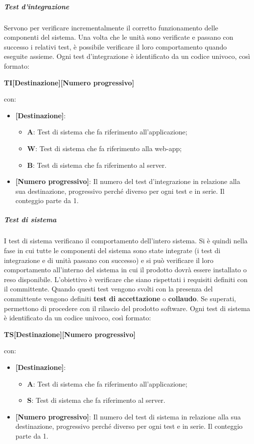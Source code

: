 \subparagraph*{Test d’integrazione} 
Servono per verificare incrementalmente il corretto funzionamento delle componenti del sistema.
Una volta che le unità sono verificate e passano con successo i relativi test, è possibile verificare il loro comportamento quando eseguite assieme.
Ogni test d’integrazione è identificato da un codice univoco, così formato:
\begin{center}
	\item \textbf{TI[Destinazione][Numero progressivo]}
\end{center}
con:
\begin{itemize}
	\item \textbf{[Destinazione]}:
	\begin{itemize}
		\item \textbf{A}: Test di sistema che fa riferimento all'applicazione;
		\item \textbf{W}: Test di sistema che fa riferimento alla web-app;
		\item \textbf{B}: Test di sistema che fa riferimento al server.
	\end{itemize}
	\item \textbf{[Numero progressivo]}: Il numero del test d’integrazione in relazione alla sua destinazione, progressivo perché diverso per ogni test e in serie. Il conteggio parte da 1.
\end{itemize}

\subparagraph*{Test di sistema} 
I test di sistema verificano il comportamento dell’intero sistema.
Si è quindi nella fase in cui tutte le componenti del sistema sono state integrate (i test di integrazione e di unità passano con successo) e si può verificare il loro comportamento all’interno del sistema in cui il prodotto dovrà essere installato o reso disponibile.
L'obiettivo è verificare che siano rispettati i requisiti definiti con il committente.
Quando questi test vengono svolti con la presenza del committente vengono definiti \textbf{test di accettazione} o \textbf{collaudo}. Se superati, permettono di procedere con il rilascio del prodotto software.
Ogni test di sistema è identificato da un codice univoco, così formato:
\begin{center}
    	\item \textbf{TS[Destinazione][Numero progressivo]}
\end{center}
con:
\begin{itemize}
    \item \textbf{[Destinazione]}:
    \begin{itemize}
        \item \textbf{A}: Test di sistema che fa riferimento all'applicazione;
        \item \textbf{S}: Test di sistema che fa riferimento al server.
    \end{itemize}
    \item \textbf{[Numero progressivo]}: Il numero del test di sistema in relazione alla sua destinazione, progressivo perché diverso per ogni test e in serie. Il conteggio parte da 1.
\end{itemize}

